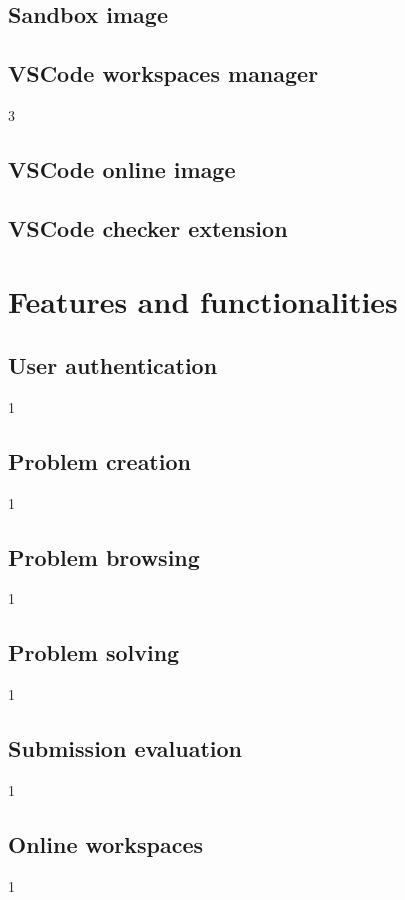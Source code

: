 \documentclass[12pt,a4paper]{report}
\begin{document}
\section{Sandbox image}

\section{VSCode workspaces manager}
3

\section{VSCode online image}

\section{VSCode checker extension}


\chapter{Features and functionalities}
\section{User authentication}
1

\section{Problem creation}
1

\section{Problem browsing}
1

\section{Problem solving}
1

\section{Submission evaluation}
1

\section{Online workspaces}
1



\end{document}
